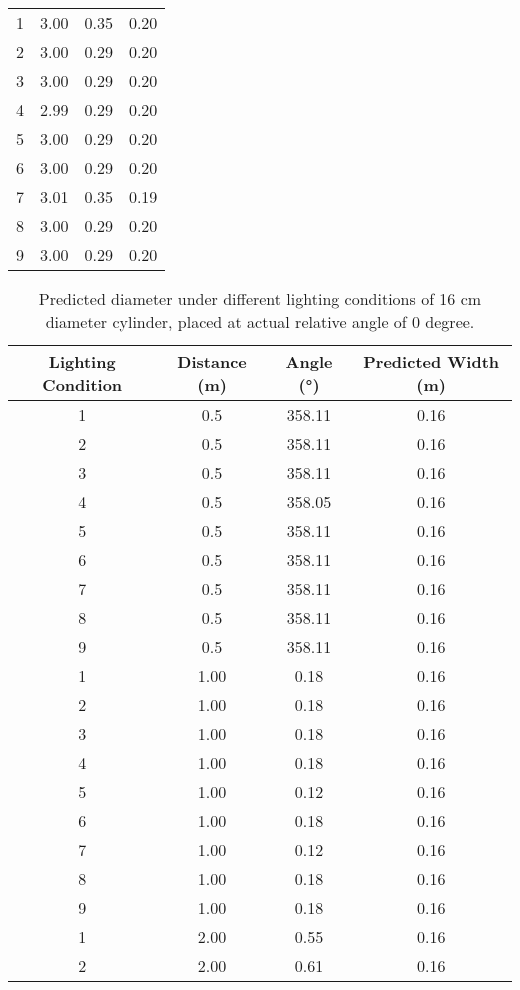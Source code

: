 \begin{table}[t]
\begin{tabular}{cccc}
    \cmidrule(lr){1-4}
    1 & 3.00 & 0.35 & 0.20 \\
    2 & 3.00 & 0.29 & 0.20 \\
    3 & 3.00 & 0.29 & 0.20 \\
    4 & 2.99 & 0.29 & 0.20 \\
    5 & 3.00 & 0.29 & 0.20 \\
    6 & 3.00 & 0.29 & 0.20 \\
    7 & 3.01 & 0.35 & 0.19 \\
    8 & 3.00 & 0.29 & 0.20 \\
    9 & 3.00 & 0.29 & 0.20 \\
    \bottomrule
    \end{tabular}
\end{table}

\begin{table}[htbp]
\centering
\caption{Predicted diameter under different lighting conditions of 16 cm diameter cylinder, placed at actual relative angle of 0 degree.}
\label{tab:16cm}
\begin{tabular}{cccc}
\toprule
\textbf{Lighting Condition} & \textbf{Distance (m)} & \textbf{Angle (°)} & \textbf{Predicted Width (m)} \\
\midrule
1 & 0.5 & 358.11 & 0.16 \\
2 & 0.5 & 358.11 & 0.16 \\
3 & 0.5 & 358.11 & 0.16 \\
4 & 0.5 & 358.05 & 0.16 \\
5 & 0.5 & 358.11 & 0.16 \\
6 & 0.5 & 358.11 & 0.16 \\
7 & 0.5 & 358.11 & 0.16 \\
8 & 0.5 & 358.11 & 0.16 \\
9 & 0.5 & 358.11 & 0.16 \\
\cmidrule(lr){1-4}
1 & 1.00 & 0.18 & 0.16 \\
2 & 1.00 & 0.18 & 0.16 \\
3 & 1.00 & 0.18 & 0.16 \\
4 & 1.00 & 0.18 & 0.16 \\
5 & 1.00 & 0.12 & 0.16 \\
6 & 1.00 & 0.18 & 0.16 \\
7 & 1.00 & 0.12 & 0.16 \\
8 & 1.00 & 0.18 & 0.16 \\
9 & 1.00 & 0.18 & 0.16 \\
\cmidrule(lr){1-4}
1 & 2.00 & 0.55 & 0.16 \\
2 & 2.00 & 0.61 & 0.16 \\

\end{tabular}
\end{table}
